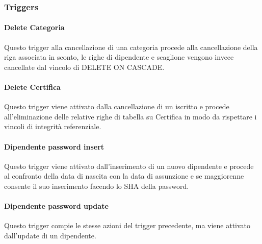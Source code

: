 


\subsubsection{Triggers}

\paragraph*{Delete Categoria}

Questo trigger alla cancellazione di una categoria procede alla cancellazione della riga associata in sconto, le righe di dipendente e scaglione vengono invece cancellate dal vincolo di DELETE ON CASCADE.



\paragraph*{Delete Certifica}

Questo trigger viene attivato dalla cancellazione di un iscritto e procede all'eliminazione delle relative righe di tabella su Certifica in modo da rispettare i vincoli di integrit\`a referenziale.



\paragraph*{Dipendente password insert}

Questo trigger viene attivato dall'inserimento di un nuovo dipendente e procede al confronto della data di nascita con la data di assunzione e se maggiorenne consente il suo inserimento facendo lo SHA della password.



\paragraph*{Dipendente password update}

Questo trigger compie le stesse azioni del trigger precedente, ma viene attivato dall'update di un dipendente.

